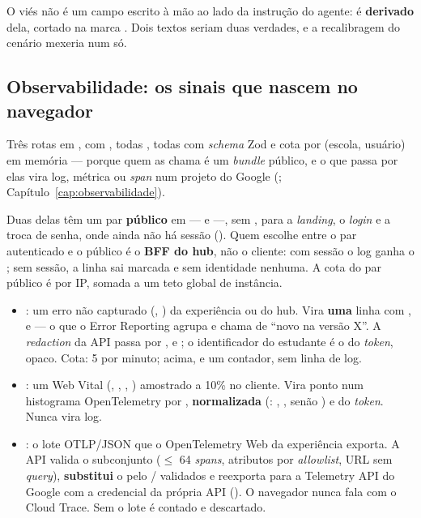 \begin{nota}
O viés não é um campo escrito à mão ao lado da instrução do agente: é
\textbf{derivado} dela, cortado na marca . Dois textos seriam duas
verdades, e a recalibragem do cenário mexeria num só.
\end{nota}

\subsection{Observabilidade: os sinais que nascem no navegador}

Três rotas em , com , todas ,
todas com \emph{schema} Zod  e cota por (escola, usuário) em
memória --- porque quem as chama é um \emph{bundle} público, e o que passa por
elas vira log, métrica ou \emph{span} num projeto do Google (;
Capítulo~\ref{cap:observabilidade}).

Duas delas têm um par \textbf{público} em 
---  e  ---, sem , para a
\emph{landing}, o \emph{login} e a troca de senha, onde ainda não há sessão
(). Quem escolhe entre o par autenticado e o público é o
\textbf{BFF do hub}, não o cliente: com sessão o log ganha o ;
sem sessão, a linha sai marcada  e sem identidade
nenhuma. A cota do par público é por IP, somada a um teto global de instância.

\begin{itemize}
  \item {}: um erro não capturado
    (, ) da experiência ou do hub.
    Vira \textbf{uma} linha  com ,
     e  --- o que o
    Error Reporting agrupa e chama de \enquote{novo na versão X}. A
    \emph{redaction} da API passa por ,  e ; o
    identificador do estudante é o do \emph{token}, opaco. Cota: 5 por minuto;
    acima,  e um contador, sem linha de log.
  \item {}: um Web Vital (, ,
    , ) amostrado a 10\% no cliente. Vira ponto num
    histograma OpenTelemetry por ,  \textbf{normalizada}
    (: , ,
    senão ) e  do \emph{token}. Nunca vira log.
  \item {}: o lote OTLP/JSON que o
    OpenTelemetry Web da experiência exporta. A API valida o subconjunto
    (\(\leq\) 64 \emph{spans}, atributos por \emph{allowlist}, URL sem
    \emph{query}), \textbf{substitui} o  pelo
    / validados e reexporta para a
    Telemetry API do Google com a credencial da própria API
    (). O navegador nunca fala com o Cloud Trace.
    Sem  o lote é contado e descartado.
\end{itemize}

